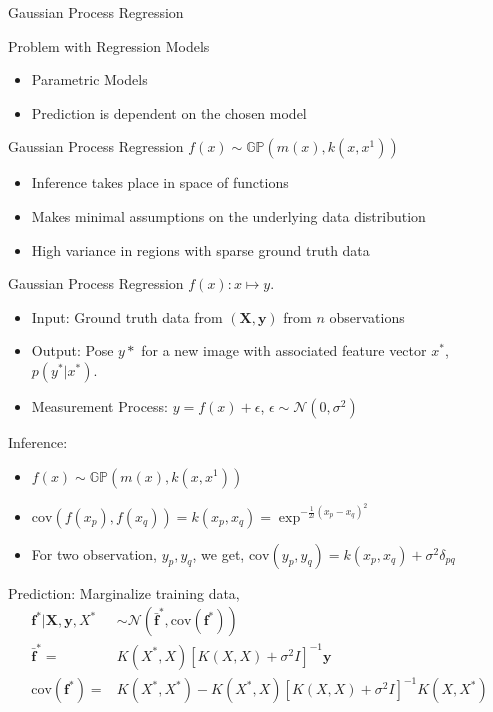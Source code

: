 \begin{frame}{Gaussian Process Regression}
\begin{block}{Problem with Regression Models}
\begin{itemize}
\item Parametric Models
\item Prediction is dependent on the chosen model
\end{itemize}
\end{block}
\begin{block}{Gaussian Process Regression}
$f(x) \sim \mathbb{GP}(m(x),k(x,x^1))$
\begin{itemize}
\item Inference takes place in space of functions
\item Makes minimal assumptions on the underlying data distribution
\item High variance in regions with sparse ground truth data
\end{itemize}
\end{block}
\end{frame}

\begin{frame}{Gaussian Process Regression}
$f(x): x \mapsto y$. 
\begin{itemize}
\item Input: Ground truth data  from $(\mathbf{X},\mathbf{y})$ from $n$ observations
\item Output: Pose $y*$ for a new image with associated feature vector $x^*$, $p(y^*|x^*)$. 
\item Measurement Process: $y = f(x)+\epsilon $, $\epsilon \sim \mathcal{N}(0,\sigma^2)$
\end{itemize}
Inference:
\begin{itemize}
\item $f(x) \sim \mathbb{GP}(m(x),k(x,x^1))$
\item $\mathrm{cov}(f(x_p),f(x_q)) = k(x_p,x_q) = \exp^{-\frac{1}{2l}(x_p-x_q)^2}$
\item For two observation, $y_p,y_q$, we get, $\mathrm{cov}(y_p,y_q)=k(x_p,x_q)+\sigma^{2}\delta_{pq} $
\end{itemize}
Prediction: Marginalize training data,
\begin{align}
\mathbf{f}^*|\mathbf{X},\mathbf{y},X^*&\sim \mathcal{N}(\mathbf{\bar{f}}^*,\mathrm{cov}(\mathbf{f}^*)) \label{eq:final_prediction}\\
\mathbf{\bar{f}}^* = &K(X^*,X)[K(X,X)+\sigma^2I]^{-1}\mathbf{y} \nonumber \\
\mathrm{cov}(\mathbf{f}^*) = &K(X^*,X^*)- K(X^*,X)[K(X,X)+\sigma^2I]^{-1}K(X,X^*) \nonumber 
\end{align}
\end{frame}

